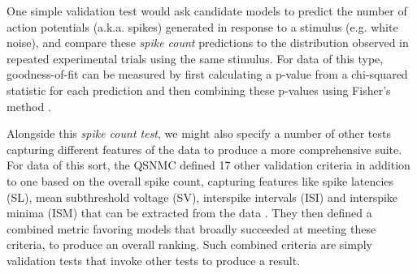 \documentclass[9pt]{sig-alternate}
\begin{document}
One simple validation test would ask candidate models to predict the number of action potentials (a.k.a. spikes) generated in response to a stimulus (e.g. white noise), and compare these \emph{spike count} predictions to the distribution observed in repeated experimental trials using the same stimulus. 
For data of this type, goodness-of-fit can be measured by first calculating a p-value from a chi-squared statistic for each prediction and then combining these p-values using Fisher's method \cite{fisher_statistical_1925}. 

Alongside this \emph{spike count test}, we might also specify a number of other tests capturing different features of the data  to produce a more comprehensive suite. 
For data of this sort, the QSNMC defined 17 other validation criteria in addition to one based on the overall spike count, capturing features like spike latencies (SL), mean subthreshold voltage (SV), interspike intervals (ISI) and interspike minima (ISM) that can be extracted from the data \cite{jolivet_quantitative_2008}. 
They then defined a combined metric favoring models that broadly succeeded at meeting these criteria, to produce an overall ranking. 
Such combined criteria are simply validation tests that invoke other tests to produce a result.
 
\end{document}
